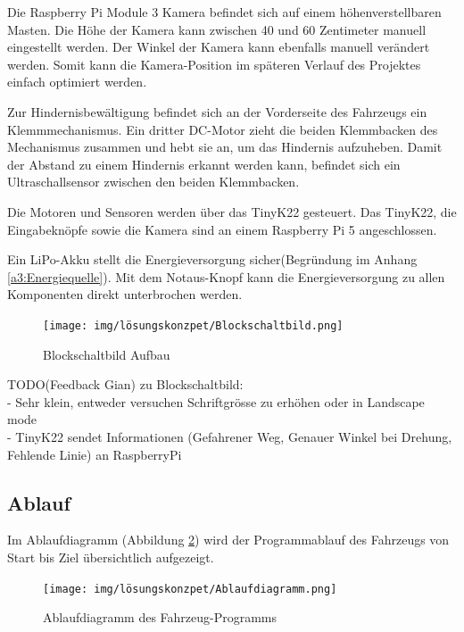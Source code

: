 \documentclass[../main.tex]{subfiles}
\begin{document}
Die Raspberry Pi Module 3 Kamera befindet sich auf einem höhenverstellbaren Masten. Die Höhe der Kamera kann zwischen 40 und 60 Zentimeter manuell eingestellt werden. Der Winkel der Kamera kann ebenfalls manuell verändert werden. Somit kann die Kamera-Position im späteren Verlauf des Projektes einfach optimiert werden.

Zur Hindernisbewältigung befindet sich an der Vorderseite des Fahrzeugs ein Klemmmechanismus. Ein dritter DC-Motor zieht die beiden Klemmbacken des Mechanismus zusammen und hebt sie an, um das Hindernis aufzuheben. Damit der Abstand zu einem Hindernis erkannt werden kann, befindet sich ein Ultraschallsensor zwischen den beiden Klemmbacken. 

Die Motoren und Sensoren werden über das TinyK22 gesteuert.
Das TinyK22, die Eingabeknöpfe sowie die Kamera sind an einem Raspberry Pi 5 angeschlossen.

Ein LiPo-Akku stellt die Energieversorgung sicher(Begründung im Anhang \ref{a3:Energiequelle}).
Mit dem Notaus-Knopf kann die Energieversorgung zu allen Komponenten direkt unterbrochen werden.
\newline
\newline
\begin{figure}[H]
\centering
\texttt{[image: img/lösungskonzpet/Blockschaltbild.png]}
\caption{Blockschaltbild Aufbau}
\label{img:Blockschaltbild-Aufbau}
\end{figure}

{\color{red} TODO(Feedback Gian) zu Blockschaltbild:} \\
- Sehr klein, entweder versuchen Schriftgrösse zu erhöhen oder in Landscape mode \\
- TinyK22 sendet Informationen (Gefahrener Weg, Genauer Winkel bei Drehung, Fehlende Linie) an RaspberryPi \\

\newpage
\subsection{Ablauf}

Im Ablaufdiagramm (Abbildung \ref{img:ablaufdiagramm}) wird der Programmablauf des Fahrzeugs von Start bis Ziel übersichtlich aufgezeigt.

\begin{figure}[H]
\texttt{[image: img/lösungskonzpet/Ablaufdiagramm.png]}
\caption{Ablaufdiagramm des Fahrzeug-Programms}
\label{img:ablaufdiagramm}
\end{figure}
\end{document}
